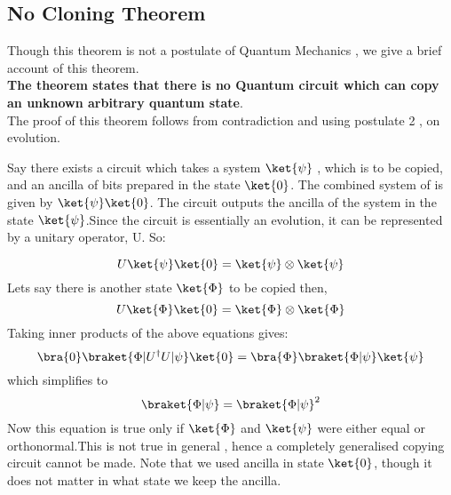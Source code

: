 \subsection{No Cloning Theorem}
Though this theorem is not a postulate of Quantum Mechanics , we give a brief account of this theorem.\\\textbf{The theorem states that there is no Quantum circuit which can copy an unknown arbitrary quantum state}.
\\
The proof of this theorem follows from contradiction and using postulate 2 ,  on evolution.\par
Say there exists a circuit which takes a system $\ket{\psi}$ , which is to be copied, and an ancilla of bits prepared in the state $\ket{0}$. The combined system of is given by $\ket{\psi}\ket{0}$.
The circuit outputs the ancilla of the system in the state $\ket{\psi}$.Since the circuit is essentially an evolution, it can be represented by a unitary operator, U. So:

$$ U \ket{\psi}\ket{0} = \ket{\psi}\otimes \ket{\psi}$$
Lets say there is another state $\ket{\Phi}$ to be copied then,
$$ U \ket{\Phi}\ket{0} = \ket{\Phi} \otimes \ket{\Phi}$$
Taking inner products of the above equations gives:
$$\bra{0}\braket{ \Phi|U^{\dagger}U|\psi }\ket{0} = \bra{\Phi}\braket{\Phi|\psi}\ket{\psi}  $$
which simplifies to 
$$\braket{\Phi|\psi} = \braket{\Phi|\psi}^2$$
Now this equation is true only if $\ket{\Phi}$ and $\ket{\psi}$ were either equal or orthonormal.This is not true in general , hence a completely generalised copying circuit cannot be made. Note that we used ancilla in state $\ket{0}$, though it does not matter in what state we keep the ancilla.